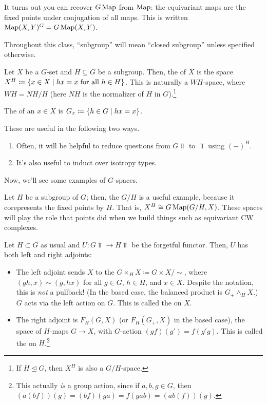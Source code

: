 It turns out you can recover $G\operatorname{Map}$ from $\operatorname{Map}$: the equivariant maps are the fixed points under conjugation of
all maps. This is written $\operatorname{Map}(X,Y)^G = G\operatorname{Map}(X,Y)$.

Throughout this class, ``subgroup'' will mean ``closed subgroup'' unless specified otherwise.
\begin{defn}
Let $X$ be a $G$-set and $H\subseteq G$ be a subgroup. Then, the  of $X$ is the space
$X^H\coloneqq \{x\in X\mid hx = x\text{ for all } h\in H\}$. This is naturally a $WH$-space, where $WH = NH/H$
(here $NH$ is the normalizer of $H$ in $G$).\footnote{If $H\trianglelefteq G$, then $X^H$ is also a
$G/H$-space.}
\end{defn}
\begin{defn}
The  of an $x\in X$ is $G_x\coloneqq \{h\in G\mid hx = x\}$.
\end{defn}
These are useful in the following two ways.
\begin{enumerate}
	\item Often, it will be helpful to reduce questions from $G\Top$ to $\Top$ using $(-)^H$.
	\item It's also useful to induct over isotropy types.
\end{enumerate}
Now, we'll see some examples of $G$-spaces.
\begin{exm}
Let $H$ be a subgroup of $G$; then, the  $G/H$ is a useful example, because it corepresents the
fixed points by $H$. That is, $X^H \cong G\operatorname{Map}(G/H, X)$. These spaces will play the role that points did when we
build things such as equivariant CW complexes.
\end{exm}
\begin{exm}
Let $H\subset G$ as usual and $U\colon G\Top\to H\Top$ be the forgetful functor. Then, $U$ has both left and right
adjoints:
\begin{itemize}
	\item The left adjoint sends $X$ to the  $G\times_H X\coloneqq G\times X/\sim$, where
	$(gh, x)\sim (g, hx)$ for all $g\in G$, $h\in H$, and $x\in X$. Despite the notation, this is \emph{not} a
	pullback! (In the based case, the balanced product is $G_+\wedge_H X$.) $G$ acts via the left action on $G$.
	This is called the  on $X$.  \item The right adjoint is $F_H(G,X)$ (or $F_H(G_+, X)$
	in the based case), the space of $H$-maps $G\to X$, with $G$-action $(gf)(g') = f(g'g)$. This is called the
	 on $H$.\footnote{This actually \emph{is} a group action, since if $a,b,g\in G$,
	then $(a(b f))(g) = (bf)(ga) = f(gab) = (ab(f))(g)$.} \qedhere
\end{itemize}
\end{exm}

